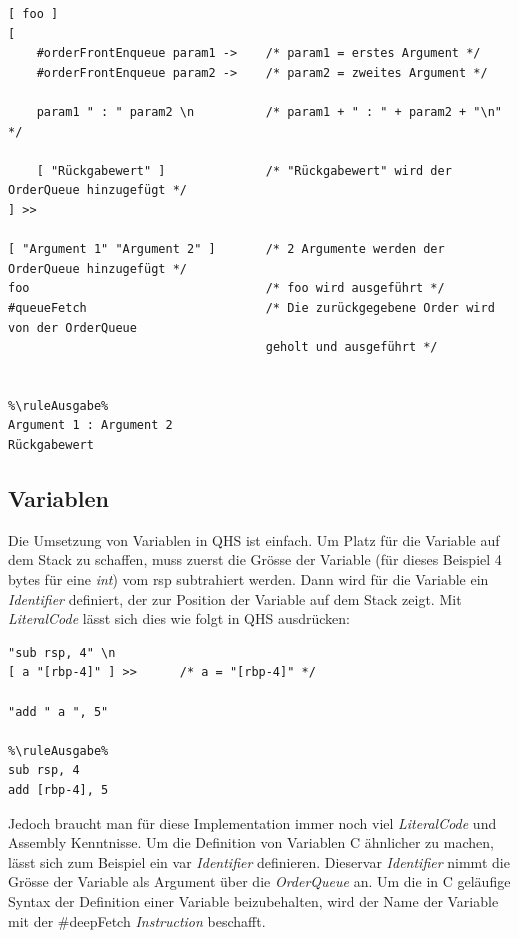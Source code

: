 \begin{lstlisting}[language=QHS, caption=Verwendung von Parametern und Rückgabewert eines \textit{Identifiers}]
%\ruleEingabe%
[ foo ]
[
    #orderFrontEnqueue param1 ->    /* param1 = erstes Argument */
    #orderFrontEnqueue param2 ->    /* param2 = zweites Argument */

    param1 " : " param2 \n          /* param1 + " : " + param2 + "\n" */

    [ "Rückgabewert" ]              /* "Rückgabewert" wird der OrderQueue hinzugefügt */
] >>

[ "Argument 1" "Argument 2" ]       /* 2 Argumente werden der OrderQueue hinzugefügt */
foo                                 /* foo wird ausgeführt */
#queueFetch                         /* Die zurückgegebene Order wird von der OrderQueue
                                    geholt und ausgeführt */


%\ruleAusgabe%
Argument 1 : Argument 2
Rückgabewert
\end{lstlisting}


\subsection{Variablen} \label{sec:qhs-vars}
Die Umsetzung von Variablen in QHS ist einfach.
Um Platz für die Variable auf dem Stack zu schaffen, muss zuerst die Grösse der Variable (für dieses Beispiel 4 bytes für eine \textit{int}) vom rsp subtrahiert werden.
Dann wird für die Variable ein \textit{Identifier} definiert, der zur Position der Variable auf dem Stack zeigt.
Mit \textit{LiteralCode} lässt sich dies wie folgt in QHS ausdrücken:

\begin{lstlisting}[language=QHS, caption=Definition einer Variable mit \textit{LiteralCode}]
%\ruleEingabe%
"sub rsp, 4" \n
[ a "[rbp-4]" ] >>      /* a = "[rbp-4]" */

"add " a ", 5"

%\ruleAusgabe%
sub rsp, 4
add [rbp-4], 5
\end{lstlisting}

Jedoch braucht man für diese Implementation immer noch viel \textit{LiteralCode} und Assembly Kenntnisse.
Um die Definition von Variablen C ähnlicher zu machen, lässt sich zum Beispiel ein {\selectListingFont var} \textit{Identifier} definieren.
Dieser{\selectListingFont var} \textit{Identifier} nimmt die Grösse der Variable als Argument über die \textit{OrderQueue} an. Um die in C geläufige Syntax der Definition einer Variable beizubehalten,
wird der Name der Variable mit der {\listingFont\selectfont \#deepFetch} \textit{Instruction} beschafft.

